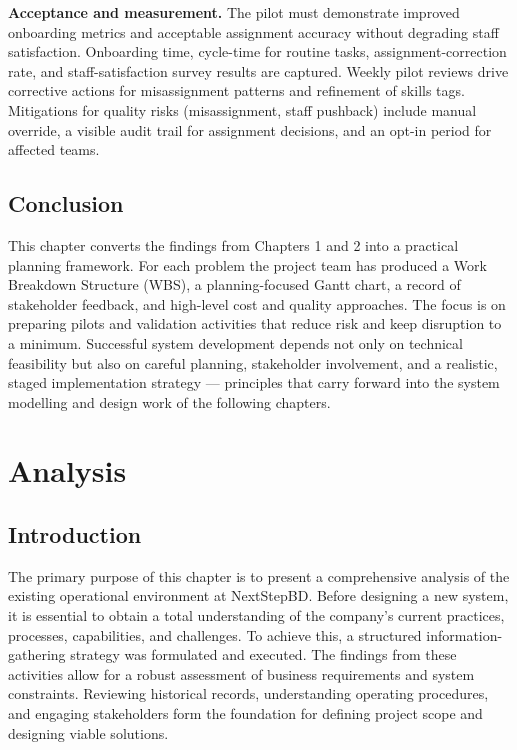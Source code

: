 \documentclass[12pt,a4paper]{report}
\begin{document}
\textbf{Acceptance and measurement.} The pilot must demonstrate improved onboarding metrics and acceptable assignment accuracy without degrading staff satisfaction. Onboarding time, cycle-time for routine tasks, assignment-correction rate, and staff-satisfaction survey results are captured. Weekly pilot reviews drive corrective actions for misassignment patterns and refinement of skills tags. Mitigations for quality risks (misassignment, staff pushback) include manual override, a visible audit trail for assignment decisions, and an opt-in period for affected teams.

\section{Conclusion}
This chapter converts the findings from Chapters 1 and 2 into a practical planning framework. For each problem the project team has produced a Work Breakdown Structure (WBS), a planning-focused Gantt chart, a record of stakeholder feedback, and high-level cost and quality approaches. The focus is on preparing pilots and validation activities that reduce risk and keep disruption to a minimum. Successful system development depends not only on technical feasibility but also on careful planning, stakeholder involvement, and a realistic, staged implementation strategy --- principles that carry forward into the system modelling and design work of the following chapters.



\chapter{Analysis}

\section{Introduction}
The primary purpose of this chapter is to present a comprehensive analysis of the existing operational environment at NextStepBD. Before designing a new system, it is essential to obtain a total understanding of the company's current practices, processes, capabilities, and challenges. To achieve this, a structured information-gathering strategy was formulated and executed. The findings from these activities allow for a robust assessment of business requirements and system constraints. Reviewing historical records, understanding operating procedures, and engaging stakeholders form the foundation for defining project scope and designing viable solutions.
\end{document}
